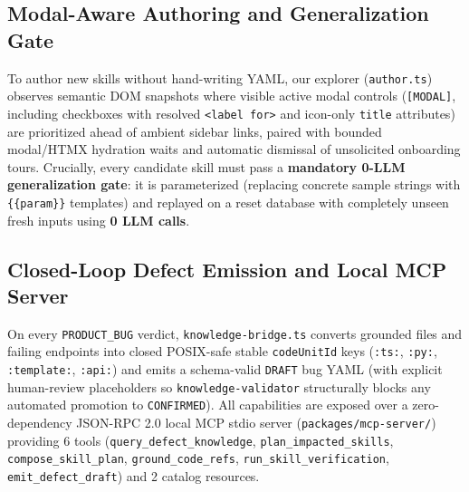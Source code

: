 \documentclass[conference]{IEEEtran}
\begin{document}
\subsection{Modal-Aware Authoring and Generalization Gate}
To author new skills without hand-writing YAML, our explorer (\texttt{author.ts}) observes semantic DOM snapshots where visible active modal controls (\texttt{[MODAL]}, including checkboxes with resolved \texttt{<label for>} and icon-only \texttt{title} attributes) are prioritized ahead of ambient sidebar links, paired with bounded modal/HTMX hydration waits and automatic dismissal of unsolicited onboarding tours. Crucially, every candidate skill must pass a \textbf{mandatory 0-LLM generalization gate}: it is parameterized (replacing concrete sample strings with \texttt{\{\{param\}\}} templates) and replayed on a reset database with completely unseen fresh inputs using \textbf{0 LLM calls}.

\subsection{Closed-Loop Defect Emission and Local MCP Server}
On every \texttt{PRODUCT\_BUG} verdict, \texttt{knowledge-bridge.ts} converts grounded files and failing endpoints into closed POSIX-safe stable \texttt{codeUnitId} keys (\texttt{:ts:}, \texttt{:py:}, \texttt{:template:}, \texttt{:api:}) and emits a schema-valid \texttt{DRAFT} bug YAML (with explicit human-review placeholders so \texttt{knowledge-validator} structurally blocks any automated promotion to \texttt{CONFIRMED}). All capabilities are exposed over a zero-dependency JSON-RPC 2.0 local MCP stdio server (\texttt{packages/mcp-server/}) providing 6 tools (\texttt{query\_defect\_knowledge}, \texttt{plan\_impacted\_skills}, \texttt{compose\_skill\_plan}, \texttt{ground\_code\_refs}, \texttt{run\_skill\_verification}, \texttt{emit\_defect\_draft}) and 2 catalog resources.
\end{document}
